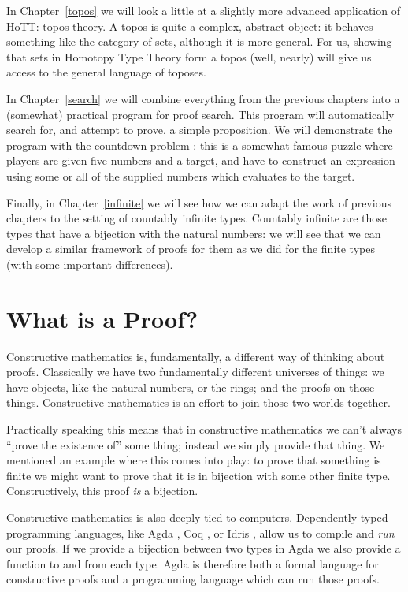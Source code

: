 In Chapter~\ref{topos} we will look a little at a slightly more advanced
application of HoTT: topos theory.
A topos is quite a complex, abstract object: it behaves something like the
category of sets, although it is more general.
For us, showing that sets in Homotopy Type Theory form a topos (well, nearly)
will give us access to the general language of toposes.

In Chapter~\ref{search} we will combine everything from the previous chapters
into a (somewhat) practical program for proof search.
This program will automatically search for, and attempt to prove, a simple
proposition.
We will demonstrate the program with the countdown problem
\citep{huttonCountdownProblem2002}: this is a somewhat famous puzzle where
players are given five numbers and a target, and have to construct an expression
using some or all of the supplied numbers which evaluates to the target.

Finally, in Chapter~\ref{infinite} we will see how we can adapt the work of
previous chapters to the setting of countably infinite types.
Countably infinite are those types that have a bijection with the natural
numbers: we will see that we can develop a similar framework of proofs for them
as we did for the finite types (with some important differences).
\section{What is a Proof?}
Constructive mathematics is, fundamentally, a different way of thinking about
proofs.
Classically we have two fundamentally different universes of things: we have
objects, like the natural numbers, or the rings; and the proofs on those things.
Constructive mathematics is an effort to join those two worlds together.

Practically speaking this means that in constructive mathematics we can't
always ``prove the existence of'' some thing; instead we simply provide that
thing.
We mentioned an example where this comes into play: to prove that something is
finite we might want to prove that it is in bijection with some other finite
type.
Constructively, this proof \emph{is} a bijection.

Constructive mathematics is also deeply tied to computers.
Dependently-typed programming languages, like Agda
\citep{norellDependentlyTypedProgramming2008}, Coq
\citep{thecoqdevelopmentteamCoqProofAssistant2020}, or Idris
\citep{bradyIdrisGeneralpurposeDependently2013}, allow us to compile and
\emph{run} our proofs.
If we provide a bijection between two types in Agda we also provide a function
to and from each type.
Agda is therefore both a formal language for constructive proofs and a
programming language which can run those proofs.


